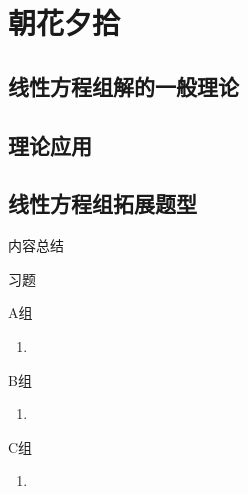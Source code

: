 \chapter{朝花夕拾}

\section{线性方程组解的一般理论}

\section{理论应用}

\section{线性方程组拓展题型}

\vspace{2ex} 
\centerline{\heiti \Large 内容总结}

\vspace{2ex} 

\centerline{\heiti \Large 习题}
\vspace{2ex} 
{\kaishu }
\begin{flushright}
    \kaishu

\end{flushright}
\centerline{\heiti A组}
\begin{enumerate}
	\item 
\end{enumerate}
\centerline{\heiti B组}
\begin{enumerate}
	\item 
\end{enumerate}
\centerline{\heiti C组}
\begin{enumerate}
	\item 
\end{enumerate}
